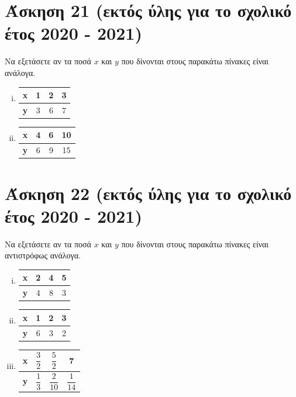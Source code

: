 \documentclass[a4paper,10pt]{report}
\begin{document}
\section*{Άσκηση 21 (εκτός ύλης για το σχολικό έτος 2020 - 2021) \hfill \small{}}
Να εξετάσετε αν τα ποσά $x$ και $y$ που δίνονται στους παρακάτω πίνακες είναι ανάλογα.
\begin{enumerate}[i)]
 \item 
 \begin{center}
\begin{tabular}{|c|c|c|c|}\hline
\textbf{x} & 1 & 2 & 3 \\\hline
\textbf{y} & 3 & 6 & 7 \\\hline
\end{tabular}
\end{center}
 
 \item 
  \begin{center}
\begin{tabular}{|c|c|c|c|}\hline
\textbf{x} & 4 & 6 & 10 \\\hline
\textbf{y} & 6 & 9 & 15 \\\hline
\end{tabular}
\end{center}
\end{enumerate}

\section*{Άσκηση 22 (εκτός ύλης για το σχολικό έτος 2020 - 2021) \hfill \small{}}
Να εξετάσετε αν τα ποσά $x$ και $y$ που δίνονται στους παρακάτω πίνακες είναι αντιστρόφως ανάλογα.
\begin{enumerate}[i)]
 \item 
  \begin{center}
\begin{tabular}{|c|c|c|c|}\hline
\textbf{x} & 2 & 4 & 5 \\\hline
\textbf{y} & 4 & 8 & 3 \\\hline
\end{tabular}
\end{center}
 \item 
  \begin{center}
\begin{tabular}{|c|c|c|c|}\hline
\textbf{x} & 1 & 2 & 3 \\\hline
\textbf{y} & 6 & 3 & 2 \\\hline
\end{tabular}
\end{center}
 \item 
  \begin{center}
\begin{tabular}{|c|c|c|c|}\hline
\textbf{x} & $\dfrac{3}{2}$  & $\dfrac{5}{2}$  & 7 \\\hline
\textbf{y} & $\dfrac{1}{3}$  & $\dfrac{2}{10}$ & $\dfrac{1}{14}$ \\\hline
\end{tabular}
\end{center}
\end{enumerate}
\end{document}
